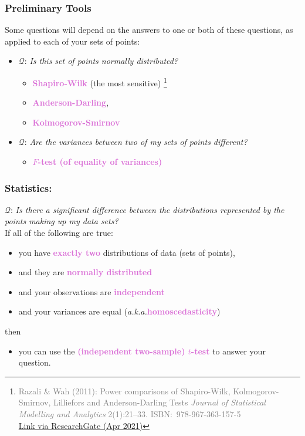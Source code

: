 \documentclass{beamer}
\newcommand{\aka}{\textit{a.k.a.}\xspace}
\newcommand{\key}[1]{\textcolor{orchid}{{\bf #1}}}
\newcommand{\kq}[1]{\textcolor{burntumber}{$\mathcal{Q}$: \emph{#1}}}
\begin{document}
\begin{frame}
\frametitle{Preliminary Tools}
Some questions will depend on the answers to one or both of
these questions, as applied to each of your sets of points:
\begin{itemize}
\item \kq{Is this set of points normally distributed?}
	\pause
	\begin{itemize}
	\item \key{Shapiro-Wilk} (the most sensitive)%
			\footnote{\textcolor{grey}{Razali \& Wah (2011):
					Power comparisons of Shapiro-Wilk, Kolmogorov-Smirnov, Lilliefors and Anderson-Darling Tests
					\emph{Journal of  Statistical Modelling and Analytics} 2(1):21--33. ISBN:~978-967-363-157-5\\ \href{https://www.researchgate.net/profile/Bee-Yap/publication/267205556_Power_Comparisons_of_Shapiro-Wilk_Kolmogorov-Smirnov_Lilliefors_and_Anderson-Darling_Tests/links/5477245b0cf29afed61446e1/Power-Comparisons-of-Shapiro-Wilk-Kolmogorov-Smirnov-Lilliefors-and-Anderson-Darling-Tests.pdf}{Link via ResearchGate (Apr 2021)}}}
	\item \key{Anderson-Darling},
	\item \key{Kolmogorov-Smirnov}
	\end{itemize}
	\vspace{1em}\pause
\item \kq{Are the variances between two of my sets of points different?}
	\pause
	\begin{itemize}
	\item \key{$F$-test (of equality of variances)}
	\end{itemize}
\end{itemize}
\end{frame}

\begin{frame}
\frametitle{Statistics: }
\kq{Is there a significant difference between the distributions represented by the points making up my data sets?}\\
If all of the following are true:
\begin{itemize}
\item you have \key{exactly two} distributions of data (sets of points), \pause
\item and they are \key{normally distributed} \pause
\item and your observations are \key{independent} \pause
\item and your variances are equal (\aka \key{homoscedasticity}) \pause
\end{itemize}
then \pause
\begin{itemize}
\item you can use the \key{(independent two-sample) $t$-test}
to answer your question.
\end{itemize}
\end{frame}
\end{document}
